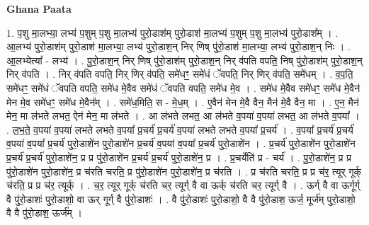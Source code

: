 \documentclass[17pt]{extarticle}
\begin{document}
\textbf{Ghana Paata } \newline

1. प॒शु मा॒लभ्या॒ लभ्य॑ प॒शुम् प॒शु मा॒लभ्य॑ पुरो॒डाश॑म् पुरो॒डाश॑ मा॒लभ्य॑ प॒शुम् प॒शु मा॒लभ्य॑ पुरो॒डाश᳚म् । . आ॒लभ्य॑ पुरो॒डाश॑म् पुरो॒डाश॑ मा॒लभ्या॒ लभ्य॑ पुरो॒डाश॒न् निर् णिष् पु॑रो॒डाश॑ मा॒लभ्या॒ लभ्य॑ पुरो॒डाश॒न् निः । . आ॒लभ्येत्या᳚ - लभ्य॑ । . पु॒रो॒डाश॒न् निर् णिष् पु॑रो॒डाश॑म् पुरो॒डाश॒न् निर् व॑पति वपति॒ निष् पु॑रो॒डाश॑म् पुरो॒डाश॒न् निर् व॑पति । . निर् व॑पति वपति॒ निर् णिर् व॑पति॒ समे॑धꣳ॒॒ समे॑धं ॅवपति॒ निर् णिर् व॑पति॒ समे॑धम् । . व॒प॒ति॒ समे॑धꣳ॒॒ समे॑धं ॅवपति वपति॒ समे॑ध मे॒वैव समे॑धं ॅवपति वपति॒ समे॑ध मे॒व । . समे॑ध मे॒वैव समे॑धꣳ॒॒ समे॑ध मे॒वैन॑ मेन मे॒व समे॑धꣳ॒॒ समे॑ध मे॒वैन᳚म् । . समे॑ध॒मिति॒ स - मे॒ध॒म् । . ए॒वैन॑ मेन मे॒वै वैन॒ मैन॑ मे॒वै वैन॒ मा । . ए॒न॒ मैन॑ मेन॒ मा ल॑भते लभत॒ ऐन॑ मेन॒ मा ल॑भते । . आ ल॑भते लभत॒ आ ल॑भते व॒पया॑ व॒पया॑ लभत॒ आ ल॑भते व॒पया᳚ । . ल॒भ॒ते॒ व॒पया॑ व॒पया॑ लभते लभते व॒पया᳚ प्र॒चर्य॑ प्र॒चर्य॑ व॒पया॑ लभते लभते व॒पया᳚ प्र॒चर्य॑ । . व॒पया᳚ प्र॒चर्य॑ प्र॒चर्य॑ व॒पया॑ व॒पया᳚ प्र॒चर्य॑ पुरो॒डाशे॑न पुरो॒डाशे॑न प्र॒चर्य॑ व॒पया॑ व॒पया᳚ प्र॒चर्य॑ पुरो॒डाशे॑न । . प्र॒चर्य॑ पुरो॒डाशे॑न पुरो॒डाशे॑न प्र॒चर्य॑ प्र॒चर्य॑ पुरो॒डाशे॑न॒ प्र प्र पु॑रो॒डाशे॑न प्र॒चर्य॑ प्र॒चर्य॑ पुरो॒डाशे॑न॒ प्र । . प्र॒चर्येति॑ प्र - चर्य॑ । . पु॒रो॒डाशे॑न॒ प्र प्र पु॑रो॒डाशे॑न पुरो॒डाशे॑न॒ प्र च॑रति चरति॒ प्र पु॑रो॒डाशे॑न पुरो॒डाशे॑न॒ प्र च॑रति । . प्र च॑रति चरति॒ प्र प्र च॑र॒ त्यूर् गूर्क् च॑रति॒ प्र प्र च॑र॒ त्यूर्क् । . च॒र॒ त्यूर् गूर्क् च॑रति चर॒ त्यूर्ग् वै वा ऊर्क् च॑रति चर॒ त्यूर्ग् वै । . ऊर्ग् वै वा ऊर्गूर्ग् वै पु॑रो॒डाशः॑ पुरो॒डाशो॒ वा ऊर् गूर्ग् वै पु॑रो॒डाशः॑ । . वै पु॑रो॒डाशः॑ पुरो॒डाशो॒ वै वै पु॑रो॒डाश॒ ऊर्ज॒ मूर्ज॑म् पुरो॒डाशो॒ वै वै पु॑रो॒डाश॒ ऊर्ज᳚म् । \newline
\end{document}
